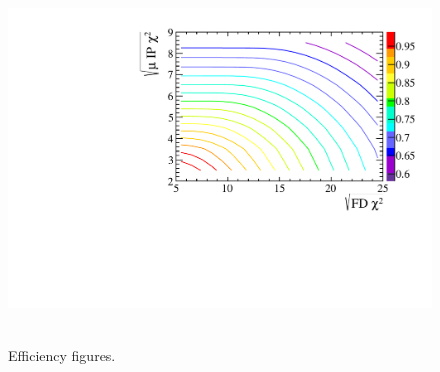 \begin{figure}
    \centering
        \includegraphics[width=\textwidth]{./Figs/Selection/Bs2MuMu_efficiency_chart_Feb3_contours.pdf}
    ~ %
    \caption{Efficiency figures.}
    \label{fig:efficiencyplots}
\end{figure}

